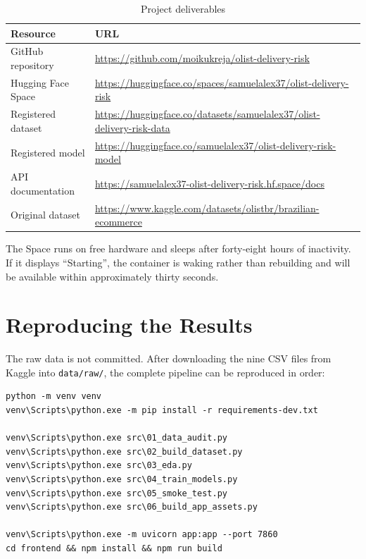 \documentclass[11pt,a4paper]{report}
\begin{document}
\begin{table}[H]
\centering
\caption{Project deliverables}
\begin{tabular}{@{}ll@{}}
\toprule
\textbf{Resource} & \textbf{URL} \\
\midrule
GitHub repository &
\url{https://github.com/moikukreja/olist-delivery-risk} \\
Hugging Face Space &
\url{https://huggingface.co/spaces/samuelalex37/olist-delivery-risk} \\
Registered dataset &
\url{https://huggingface.co/datasets/samuelalex37/olist-delivery-risk-data} \\
Registered model &
\url{https://huggingface.co/samuelalex37/olist-delivery-risk-model} \\
API documentation &
\url{https://samuelalex37-olist-delivery-risk.hf.space/docs} \\
Original dataset &
\url{https://www.kaggle.com/datasets/olistbr/brazilian-ecommerce} \\
\bottomrule
\end{tabular}
\end{table}

The Space runs on free hardware and sleeps after forty-eight hours of
inactivity. If it displays ``Starting'', the container is waking rather than
rebuilding and will be available within approximately thirty seconds.

\section{Reproducing the Results}

The raw data is not committed. After downloading the nine CSV files from Kaggle
into \texttt{data/raw/}, the complete pipeline can be reproduced in order:

\begin{lstlisting}[caption={Reproduction sequence}]
python -m venv venv
venv\Scripts\python.exe -m pip install -r requirements-dev.txt

venv\Scripts\python.exe src\01_data_audit.py
venv\Scripts\python.exe src\02_build_dataset.py
venv\Scripts\python.exe src\03_eda.py
venv\Scripts\python.exe src\04_train_models.py
venv\Scripts\python.exe src\05_smoke_test.py
venv\Scripts\python.exe src\06_build_app_assets.py

venv\Scripts\python.exe -m uvicorn app:app --port 7860
cd frontend && npm install && npm run build
\end{lstlisting}
\end{document}
